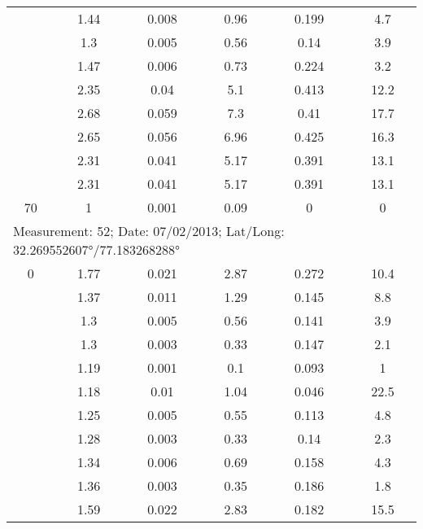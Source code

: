 \begin{longtable}{cccccc}
		& 1.44  & 0.008 & 0.96  & 0.199 & 4.7 \\
		
		& 1.3   & 0.005 & 0.56  & 0.14  & 3.9 \\
		
		& 1.47  & 0.006 & 0.73  & 0.224 & 3.2 \\
		
		& 2.35  & 0.04  & 5.1   & 0.413 & 12.2 \\
		
		& 2.68  & 0.059 & 7.3   & 0.41  & 17.7 \\
		
		& 2.65  & 0.056 & 6.96  & 0.425 & 16.3 \\
		
		& 2.31  & 0.041 & 5.17  & 0.391 & 13.1 \\
		
		& 2.31  & 0.041 & 5.17  & 0.391 & 13.1 \\
		
		70    & 1     & 0.001 & 0.09  & 0     & 0 \\
		\midrule
		\multicolumn{6}{l}{Measurement: 52; Date: 07/02/2013;
			Lat/Long: 32.269552607°/77.183268288°} \\		
		\midrule
		0     & 1.77  & 0.021 & 2.87  & 0.272 & 10.4 \\
		
		& 1.37  & 0.011 & 1.29  & 0.145 & 8.8 \\
		
		& 1.3   & 0.005 & 0.56  & 0.141 & 3.9 \\
		
		& 1.3   & 0.003 & 0.33  & 0.147 & 2.1 \\
		
		& 1.19  & 0.001 & 0.1   & 0.093 & 1 \\
		
		& 1.18  & 0.01  & 1.04  & 0.046 & 22.5 \\
		
		& 1.25  & 0.005 & 0.55  & 0.113 & 4.8 \\
		
		& 1.28  & 0.003 & 0.33  & 0.14  & 2.3 \\
		
		& 1.34  & 0.006 & 0.69  & 0.158 & 4.3 \\
		
		& 1.36  & 0.003 & 0.35  & 0.186 & 1.8 \\
		
		& 1.59  & 0.022 & 2.83  & 0.182 & 15.5 \\
		

\end{longtable}
